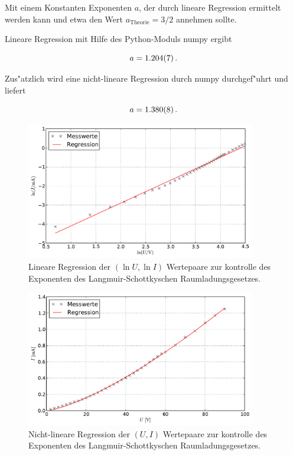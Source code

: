 		Mit einem Konstanten Exponenten $a$, der durch lineare Regression ermittelt werden kann und etwa den Wert $a_\mathrm{Theorie} = 3/2$ annehmen sollte.

		Lineare Regression mit Hilfe des Python-Moduls numpy ergibt

		\begin{equation*}
			a = \SI{1.204 (7)}{}\,.
		\end{equation*}

		Zus"atzlich wird eine nicht-lineare Regression durch numpy durchgef"uhrt und liefert

		\begin{equation*}
			a = \SI{1.380 (8)}{}\,.
		\end{equation*}

		\clearpage

		\begin{figure}[h]
			\centering
			\includegraphics[width = 10cm]{img/langmuir.pdf}
			\caption{Lineare Regression der $(\ln{U},\ln{I})$ Wertepaare zur kontrolle des Exponenten des Langmuir-Schottkyschen Raumladungsgesetzes.}
			\label{fig:langmuir}
		\end{figure}

		\begin{figure}[h]
			\centering
			\includegraphics[width = 10cm]{img/langmuir_nichtlinear.pdf}
			\caption{Nicht-lineare Regression der $(U,I)$ Wertepaare zur kontrolle des Exponenten des Langmuir-Schottkyschen Raumladungsgesetzes.}
			\label{fig:langmuir_nichtlinear}
		\end{figure}

